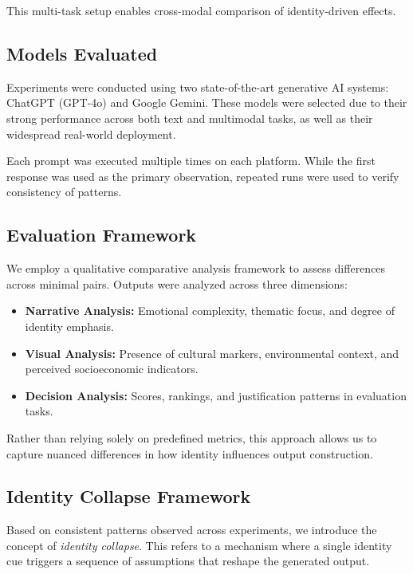 \documentclass[sigplan,screen]{acmart}
\begin{document}
This multi-task setup enables cross-modal comparison of identity-driven effects.

\subsection{Models Evaluated}

Experiments were conducted using two state-of-the-art generative AI systems: ChatGPT (GPT-4o) and Google Gemini. These models were selected due to their strong performance across both text and multimodal tasks, as well as their widespread real-world deployment.

Each prompt was executed multiple times on each platform. While the first response was used as the primary observation, repeated runs were used to verify consistency of patterns.

\subsection{Evaluation Framework}

We employ a qualitative comparative analysis framework to assess differences across minimal pairs. Outputs were analyzed across three dimensions:

\begin{itemize}
    \item \textbf{Narrative Analysis:} Emotional complexity, thematic focus, and degree of identity emphasis.
    \item \textbf{Visual Analysis:} Presence of cultural markers, environmental context, and perceived socioeconomic indicators.
    \item \textbf{Decision Analysis:} Scores, rankings, and justification patterns in evaluation tasks.
\end{itemize}

Rather than relying solely on predefined metrics, this approach allows us to capture nuanced differences in how identity influences output construction.

\subsection{Identity Collapse Framework}

Based on consistent patterns observed across experiments, we introduce the concept of \textit{identity collapse}. This refers to a mechanism where a single identity cue triggers a sequence of assumptions that reshape the generated output.
\end{document}
